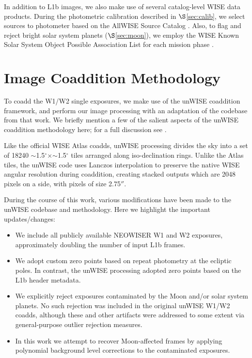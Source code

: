 \documentclass{emulateapj}
\begin{document}

In addition to L1b images, we also make use of several catalog-level WISE
data products. During the photometric calibration described in 
$\S$\ref{sec:calib}, we select sources to photometer based on the AllWISE 
Source Catalog \citep{cutri13}. Also, to flag and reject bright solar system 
planets ($\S$\ref{sec:moon}), we employ the WISE Known Solar System Object
Possible Association List for each mission phase 
\citep{cutri12, cutri13,cutri15}.

\section{Image Coaddition Methodology}
\label{sec:coadd}


To coadd the W1/W2 single exposures, we make use of the \cite{lang14}
unWISE coaddition framework, and perform our image processing with an 
adaptation of the codebase from that work. We briefly mention
a few of the salient aspects of the unWISE coaddition methodology here; for
a full discussion see \cite{lang14}.

Like the official WISE Atlas coadds, unWISE processing divides the sky
into a set of 18240 $\sim$1.5$^{\circ}$$\times$$\sim$1.5$^{\circ}$ tiles
arranged along iso-declination rings. Unlike the Atlas tiles, the
unWISE code uses Lanczos interpolation to preserve the native WISE 
angular resolution during coaddition, creating stacked outputs which are 2048 
pixels on a side, with pixels of size 2.75$''$.

During the course of this work, various modifications have been made to the
 unWISE codebase and methodology. Here we highlight the important 
updates/changes:

\begin{itemize}
\item We include all publicly available NEOWISER W1 and W2 exposures, 
approximately doubling the number of input L1b frames.
\item We adopt custom zero points based on repeat photometry at the ecliptic 
poles. In contrast, the \cite{lang14} unWISE processing adopted zero points 
based on the L1b header metadata.
\item We explicitly reject exposures contaminated by the Moon and/or solar 
system planets. No such rejection was included in the original unWISE W1/W2 
coadds, although these and other artifacts were addressed to some extent via 
general-purpose outlier rejection measures.
\item In this work we attempt to recover Moon-affected frames by applying 
polynomial background level corrections to the contaminated exposures.
\end{itemize}
\end{document}
